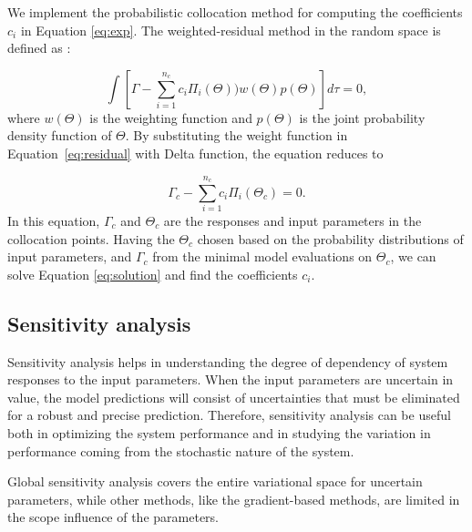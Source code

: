 We implement the probabilistic collocation method for computing the
coefficients $c_i$ in Equation \ref{eq:exp}. The weighted-residual method in
the random space is defined as \cite{nLi2007}:


\begin{equation}
\int\left[\Gamma-\underset{i=1}{\overset{n_c}{\sum}}c_{i}\Pi_{i}
(\Theta))w(\Theta)p(\Theta)\right]d\tau=0,\label{eq:residual}
\end{equation}
where $w(\Theta)$ is the weighting function and $p(\Theta)$ is the joint
probability density function of $\Theta$. By substituting the weight function in
Equation~\ref{eq:residual} with  Delta function, the equation reduces to

\begin{equation}
 \Gamma_{c}-\underset{i=1}{\overset{n_c}{\sum}c_{i}}\Pi_{i}(\Theta_{c})=0.
\label{eq:solution}
\end{equation} In this equation, $\Gamma_c$ and $\Theta_c$ are the responses and
input parameters in the collocation points. Having the $\Theta_c$ chosen based
on the probability distributions of input parameters, and $\Gamma_c$ from the
minimal model evaluations on $\Theta_c$, we can solve Equation
\ref{eq:solution} and find the coefficients $c_i$.

\subsection{Sensitivity analysis}
\label{Section:SA}

Sensitivity analysis helps in understanding the degree of dependency of system
responses to the input parameters. When the input parameters are uncertain in
value, the model predictions will consist of uncertainties that must be
eliminated for a robust and precise prediction. Therefore, sensitivity analysis
can be useful both in optimizing the system performance and in studying the
variation in performance coming from the stochastic nature of the system.

Global sensitivity analysis covers the entire variational space for uncertain
parameters, while other methods, like the gradient-based methods, are limited
in the scope influence of the parameters. 

